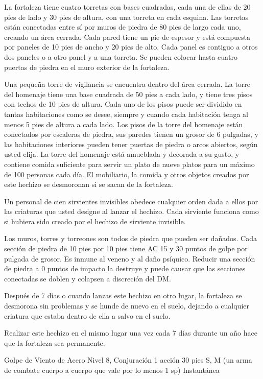 \documentclass[a4paper,twocolumn,openany,10pt]{dndbook}
\begin{document}
	La fortaleza tiene cuatro torretas con bases cuadradas, cada una de ellas de 20 pies de lado y 30 pies de altura, con una
	torreta en cada esquina. Las torretas están conectadas entre sí por muros de piedra de 80 pies de largo cada uno, creando un
	área cerrada. Cada pared tiene un pie de espesor y está compuesta por paneles de 10 pies de ancho y 20 pies de alto. Cada
	panel es contiguo a otros dos paneles o a otro panel y a una torreta. Se pueden colocar hasta cuatro puertas de piedra en el
	muro exterior de la fortaleza.
	
	Una pequeña torre de vigilancia se encuentra dentro del área cerrada. La torre del homenaje tiene una base cuadrada de 50
	pies a cada lado, y tiene tres pisos con techos de 10 pies de altura. Cada uno de los pisos puede ser dividido en tantas
	habitaciones como se desee, siempre y cuando cada habitación tenga al menos 5 pies de altura a cada lado. Los pisos de la
	torre del homenaje están conectados por escaleras de piedra, sus paredes tienen un grosor de 6 pulgadas, y las habitaciones
	interiores pueden tener puertas de piedra o arcos abiertos, según usted elija. La torre del homenaje está amueblada y
	decorada a su gusto, y contiene comida suficiente para servir un plato de nueve platos para un máximo de 100 personas cada
	día. El mobiliario, la comida y otros objetos creados por este hechizo se desmoronan si se sacan de la fortaleza.
	
	Un personal de cien sirvientes invisibles obedece cualquier orden dada a ellos por las criaturas que usted designe al lanzar
	el hechizo. Cada sirviente funciona como si hubiera sido creado por el hechizo de sirviente invisible.
	
	Los muros, torres y torreones son todos de piedra que pueden ser dañados. Cada sección de piedra de 10 pies por 10 pies
	tiene AC 15 y 30 puntos de golpe por pulgada de grosor. Es inmune al veneno y al daño psíquico. Reducir una sección de
	piedra a 0 puntos de impacto la destruye y puede causar que las secciones conectadas se doblen y colapsen a discreción del
	DM.
	
	Después de 7 días o cuando lanzas este hechizo en otro lugar, la fortaleza se desmorona sin problemas y se hunde de nuevo en
	el suelo, dejando a cualquier criatura que estaba dentro de ella a salvo en el suelo.
	
	Realizar este hechizo en el mismo lugar una vez cada 7 días durante un año hace que la fortaleza sea permanente. 

\spellheader%
	{Golpe de Viento de Acero}
	{Nivel 8, Conjuración}
	{1 acción}
	{30 pies}
	{S, M (un arma de combate cuerpo a cuerpo que vale por lo menos 1 sp)}
	{Instantánea}
	
\end{document}
